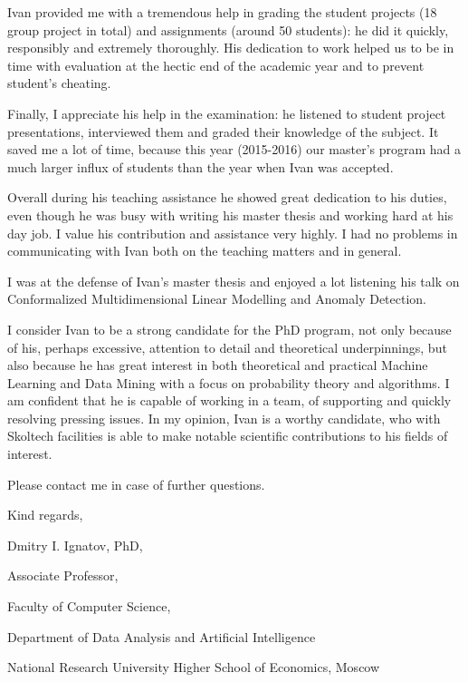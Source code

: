 \documentclass[14pt]{letter}
\begin{document}
Ivan provided me with a tremendous help in grading the student projects (18 group project in total)
and assignments (around 50 students): he did it quickly, responsibly and extremely thoroughly. His
dedication to work helped us to be in time with evaluation at the hectic end of the academic year
and to prevent student's cheating. \par\medskip

Finally, I appreciate his help in the examination: he listened to student project presentations,
interviewed them and graded their knowledge of the subject. It saved me a lot of time, because this
year (2015-2016) our master's program had a much larger influx of students than the year when Ivan
was accepted. \par\medskip

Overall during his teaching assistance he showed great dedication to his duties, even though he was
busy with writing his master thesis and working hard at his day job. I value his contribution and
assistance very highly. I had no problems in communicating with Ivan both on the teaching matters
and in general. \par\medskip

I was at the defense of Ivan's master thesis and enjoyed a lot listening his talk on Conformalized
Multidimensional Linear Modelling and Anomaly Detection. \par\medskip

I consider Ivan to be a strong candidate for the PhD program, not only because of his, perhaps
excessive, attention to detail and theoretical underpinnings, but also because he has great interest
in both theoretical and practical Machine Learning and Data Mining with a focus on probability
theory and algorithms. I am confident that he is capable of working in a team, of supporting and
quickly resolving pressing issues. In my opinion, Ivan is a worthy candidate, who with Skoltech
facilities is able to make notable scientific contributions to his fields of interest. \par\medskip

Please contact me in case of further questions. \par\bigskip

Kind regards, \par \medskip

Dmitry I. Ignatov, PhD, \par
Associate Professor, \par
Faculty of Computer Science, \par
Department of Data Analysis and Artificial Intelligence \par
National Research University Higher School of Economics, Moscow \par
\end{document}
